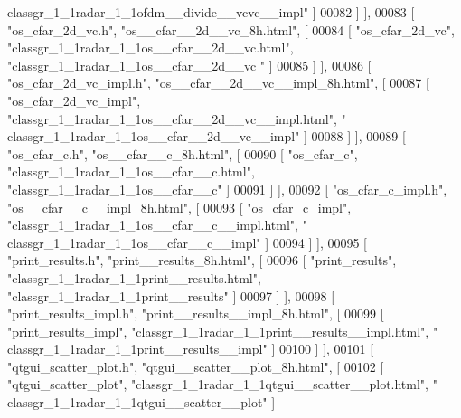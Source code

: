 \begin{DoxyCode}
{      classgr\_1\_1radar\_1\_1ofdm\_\_divide\_\_vcvc\_\_impl"} ]
00082     ] ],
00083     [ \textcolor{stringliteral}{"os\_cfar\_2d\_vc.h"}, \textcolor{stringliteral}{"os\_\_cfar\_\_2d\_\_vc\_8h.html"}, [
00084       [ \textcolor{stringliteral}{"os\_cfar\_2d\_vc"}, \textcolor{stringliteral}{"classgr\_1\_1radar\_1\_1os\_\_cfar\_\_2d\_\_vc.html"}, \textcolor{stringliteral}{"classgr\_1\_1radar\_1\_1os\_\_cfar\_\_2d\_\_vc
      "} ]
00085     ] ],
00086     [ \textcolor{stringliteral}{"os\_cfar\_2d\_vc\_impl.h"}, \textcolor{stringliteral}{"os\_\_cfar\_\_2d\_\_vc\_\_impl\_8h.html"}, [
00087       [ \textcolor{stringliteral}{"os\_cfar\_2d\_vc\_impl"}, \textcolor{stringliteral}{"classgr\_1\_1radar\_1\_1os\_\_cfar\_\_2d\_\_vc\_\_impl.html"}, \textcolor{stringliteral}{"
      classgr\_1\_1radar\_1\_1os\_\_cfar\_\_2d\_\_vc\_\_impl"} ]
00088     ] ],
00089     [ \textcolor{stringliteral}{"os\_cfar\_c.h"}, \textcolor{stringliteral}{"os\_\_cfar\_\_c\_8h.html"}, [
00090       [ \textcolor{stringliteral}{"os\_cfar\_c"}, \textcolor{stringliteral}{"classgr\_1\_1radar\_1\_1os\_\_cfar\_\_c.html"}, \textcolor{stringliteral}{"classgr\_1\_1radar\_1\_1os\_\_cfar\_\_c"} ]
00091     ] ],
00092     [ \textcolor{stringliteral}{"os\_cfar\_c\_impl.h"}, \textcolor{stringliteral}{"os\_\_cfar\_\_c\_\_impl\_8h.html"}, [
00093       [ \textcolor{stringliteral}{"os\_cfar\_c\_impl"}, \textcolor{stringliteral}{"classgr\_1\_1radar\_1\_1os\_\_cfar\_\_c\_\_impl.html"}, \textcolor{stringliteral}{"
      classgr\_1\_1radar\_1\_1os\_\_cfar\_\_c\_\_impl"} ]
00094     ] ],
00095     [ \textcolor{stringliteral}{"print\_results.h"}, \textcolor{stringliteral}{"print\_\_results\_8h.html"}, [
00096       [ \textcolor{stringliteral}{"print\_results"}, \textcolor{stringliteral}{"classgr\_1\_1radar\_1\_1print\_\_results.html"}, \textcolor{stringliteral}{"classgr\_1\_1radar\_1\_1print\_\_results"} ]
00097     ] ],
00098     [ \textcolor{stringliteral}{"print\_results\_impl.h"}, \textcolor{stringliteral}{"print\_\_results\_\_impl\_8h.html"}, [
00099       [ \textcolor{stringliteral}{"print\_results\_impl"}, \textcolor{stringliteral}{"classgr\_1\_1radar\_1\_1print\_\_results\_\_impl.html"}, \textcolor{stringliteral}{"
      classgr\_1\_1radar\_1\_1print\_\_results\_\_impl"} ]
00100     ] ],
00101     [ \textcolor{stringliteral}{"qtgui\_scatter\_plot.h"}, \textcolor{stringliteral}{"qtgui\_\_scatter\_\_plot\_8h.html"}, [
00102       [ \textcolor{stringliteral}{"qtgui\_scatter\_plot"}, \textcolor{stringliteral}{"classgr\_1\_1radar\_1\_1qtgui\_\_scatter\_\_plot.html"}, \textcolor{stringliteral}{"
      classgr\_1\_1radar\_1\_1qtgui\_\_scatter\_\_plot"} ]

\end{DoxyCode}
